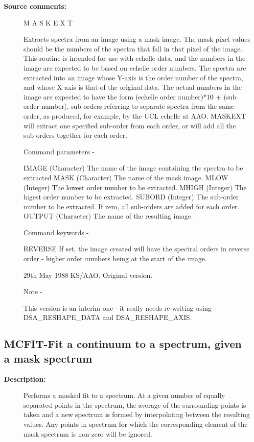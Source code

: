 \begin{description}
\begin{description}
\item [\textbf{Source comments:}]
\begin{terminalv}
 M A S K E X T

 Extracts spectra from an image using a mask image.  The mask
 pixel values should be the numbers of the spectra that fall
 in that pixel of the image.  This routine is intended for use
 with echelle data, and the numbers in the image are expected
 to be based on echelle order numbers.  The spectra are extracted
 into an image whose Y-axis is the order number of the spectra,
 and whose X-axis is that of the original data.  The actual
 numbers in the image are expected to have the form
 (echelle order number)*10 + (sub order number), sub orders
 referring to separate spectra from the same order, as
 produced, for example, by the UCL echelle at AAO.
 MASKEXT will extract one specified sub-order from each
 order, or will add all the sub-orders together for each order.

 Command parameters -

 IMAGE      (Character) The name of the image containing the
            spectra to be extracted
 MASK       (Character) The name of the mask image.
 MLOW       (Integer) The lowest order number to be extracted.
 MHIGH      (Integer) The higest order number to be extracted.
 SUBORD     (Integer) The sub-order number to be extracted.
            If zero, all sub-orders are added for each order.
 OUTPUT     (Character) The name of the resulting image.

 Command keywords -

 REVERSE    If set, the image created will have the
            spectral orders in reverse order - higher order
            numbers being at the start of the image.

 29th May 1988  KS/AAO.  Original version.

 Note -

 This version is an interim one - it really needs re-writing
 using DSA_RESHAPE_DATA and DSA_RESHAPE_AXIS.
\end{terminalv}
\end{description}
\subsection{MCFIT-\label{MCFIT}Fit a continuum to a spectrum, given a mask spectrum}
\begin{description}

\item [\textbf{Description:}]
 Performs a masked fit to a spectrum.  At a given number of
 equally separated points in the spectrum, the average of the
 surrounding points is taken and a new spectrum is formed by
 interpolating between the resulting values.  Any points in
 spectrum for which the corresponding element of the mask
 spectrum is non-zero will be ignored.


\end{description}
\end{description}
